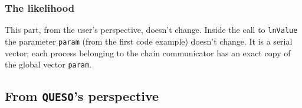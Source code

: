 \documentclass{article}
\newcommand{\Queso}{\texttt{QUESO}}
\begin{document}
\subsubsection{The likelihood}

This part, from the user's perspective, doesn't change.  Inside the call to
\lstinline|lnValue| the parameter \lstinline|param| (from the first code
example) doesn't change.  It is a serial vector; each process belonging to the
chain communicator has an exact copy of the global vector \lstinline|param|.

\subsection{From \Queso's perspective}
\end{document}
